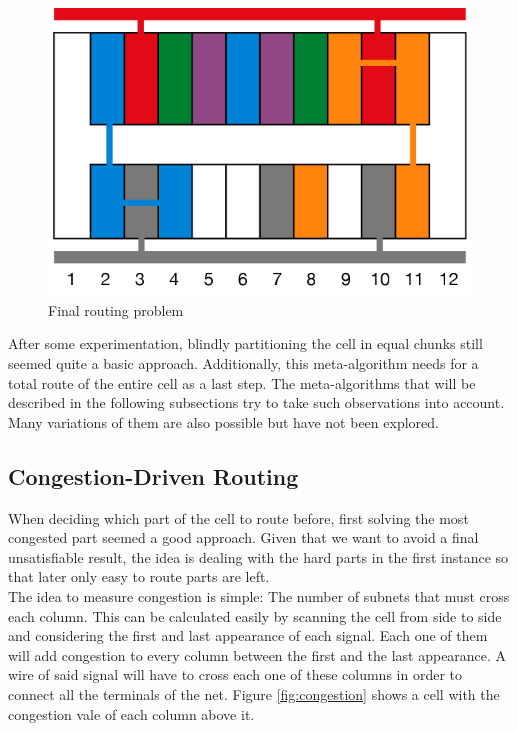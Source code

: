 \begin{figure}[h!]
  \centering
  \includegraphics[scale=0.5]{img/design/threefinal.png}
  \caption{Final routing problem}
  \label{fig:threefinal}
\end{figure} 

After some experimentation, blindly partitioning the cell in equal chunks still seemed quite a basic approach. Additionally, this meta-algorithm needs for a total route of the entire cell as a last step. The meta-algorithms that will be described in the following subsections try to take such observations into account. Many variations of them are also possible but have not been explored. \\

\subsection{Congestion-Driven Routing}

When deciding which part of the cell to route before, first solving the most congested part seemed a good approach. Given that we want to avoid a final unsatisfiable result, the idea is dealing with the hard parts in the first instance so that later only easy to route parts are left. \\

The idea to measure congestion is simple: The number of subnets that must cross each column. This can be calculated easily by scanning the cell from side to side and considering the first and last appearance of each signal. Each one of them will add congestion to every column between the first and the last appearance. A wire of said signal will have to cross each one of these columns in order to connect all the terminals of the net. Figure \ref{fig:congestion} shows a cell with the congestion vale of each column above it. \\

